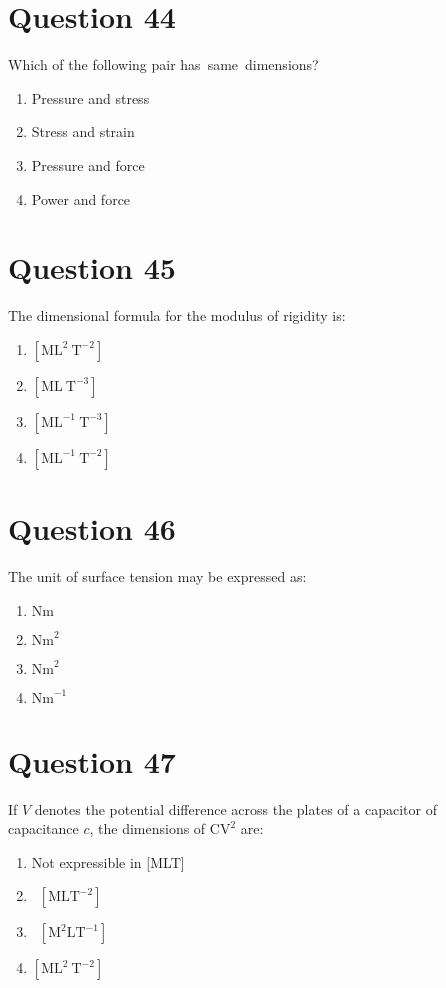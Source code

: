 \documentclass{article}
\begin{document}
\section*{Question 44}
Which of the following pair has same dimensions?
\begin{enumerate}[label=(\alph*)]
\item Pressure and stress
\item Stress and strain
\item Pressure and force
\item Power and force
\end{enumerate}
\newpage
\section*{Question 45}
The dimensional formula for the modulus of rigidity is:
\begin{enumerate}[label=(\alph*)]
\item \([\mathrm{ML}^2 \mathrm{~T}^{-2}]\)
\item \([\mathrm{ML} \mathrm{~T}^{-3}]\)
\item \([\mathrm{ML}^{-1} \mathrm{~T}^{-3}]\)
\item \([\mathrm{ML}^{-1} \mathrm{~T}^{-2}]\)
\end{enumerate}
\newpage
\section*{Question 46}
The unit of surface tension may be expressed as:
\begin{enumerate}[label=(\alph*)]
\item \(\mathrm{Nm}\)
\item \(\mathrm{Nm}^2\)
\item \(\mathrm{Nm}^2\)
\item \(\mathrm{Nm}^{-1}\)
\end{enumerate}
\newpage
\section*{Question 47}
If \(V\) denotes the potential difference across the plates of a capacitor of capacitance \(c\), the dimensions of \(\mathrm{CV}^2\) are:
\begin{enumerate}[label=(\alph*)]
\item Not expressible in [MLT]
\item  \([\mathrm{MLT}^{-2}]\)
\item  \([\mathrm{M}^2 \mathrm{LT}^{-1}]\)
\item \([\mathrm{ML}^2 \mathrm{~T}^{-2}]\)
\end{enumerate}
\newpage
\end{document}

